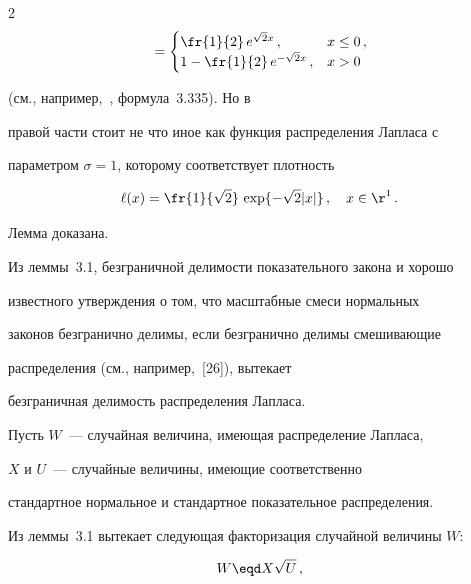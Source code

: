 \begin{multicols}{2}
\begin{multline*}
{}=


\begin{cases}


\fr{1}{2}\,e^{\sqrt{2}x}\,,&  x\le 0\,,\\


1-\fr{1}{2}\,e^{-\sqrt{2}x}\,, & x>0


\end{cases}


\end{multline*}


(см., например,~\cite{6be}, формула~3.335). Но в


правой час\-ти стоит не что иное как функция распределения Лапласа с


параметром $\sigma = 1$, которому соответствует плотность


$$


\ell(x)=\fr{1}{\sqrt{2}}\,\exp\{-\sqrt{2}|x|\}\,,\quad x\in{\r}^1\,.


$$





Лемма доказана.





\smallskip





Из леммы~3.1, безграничной делимости показательного закона и хорошо


известного утверж\-дения о том, что масштабные смеси нормальных\linebreak


законов безгранично делимы, если безгранично делимы смешивающие


распределения (см., например,~[26]), вытекает


безграничная делимость распределения Лапласа.





Пусть $W$~--- случайная величина, имеющая распределение Лапласа,


$X$ и $U$~--- случайные величины, имеющие соответственно


стандартное нормальное и стандартное показательное распределения.


Из леммы~3.1 вытекает следующая факторизация случайной величины $W$:


\begin{equation}


W\eqd X \sqrt{U}\,,\label{3.1b}



\end{equation}
\end{multicols}
